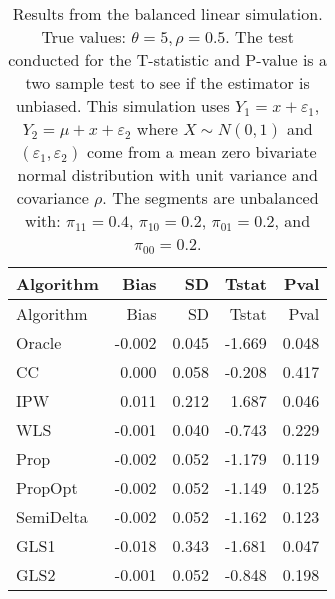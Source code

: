 \documentclass[
  letterpaper,
  DIV=11,
  numbers=noendperiod]{scrartcl}
\begin{document}
\begin{longtable}[]{@{}lrrrr@{}}
\caption{Results from the balanced linear simulation. True values:
\(\theta = 5, \rho = 0.5\). The test conducted for the T-statistic and
P-value is a two sample test to see if the estimator is unbiased. This
simulation uses \(Y_1 = x + \varepsilon_1\),
\(Y_2 = \mu + x + \varepsilon_2\) where \(X \sim N(0, 1)\) and
\((\varepsilon_1, \varepsilon_2)\) come from a mean zero bivariate
normal distribution with unit variance and covariance \(\rho\). The
segments are unbalanced with: \(\pi_{11} = 0.4\), \(\pi_{10} = 0.2\),
\(\pi_{01} = 0.2\), and \(\pi_{00} = 0.2\). }\tabularnewline
\toprule\noalign{}
Algorithm & Bias & SD & Tstat & Pval \\
\midrule\noalign{}
\endfirsthead
\toprule\noalign{}
Algorithm & Bias & SD & Tstat & Pval \\
\midrule\noalign{}
\endhead
\bottomrule\noalign{}
\endlastfoot
Oracle & -0.002 & 0.045 & -1.669 & 0.048 \\
CC & 0.000 & 0.058 & -0.208 & 0.417 \\
IPW & 0.011 & 0.212 & 1.687 & 0.046 \\
WLS & -0.001 & 0.040 & -0.743 & 0.229 \\
Prop & -0.002 & 0.052 & -1.179 & 0.119 \\
PropOpt & -0.002 & 0.052 & -1.149 & 0.125 \\
SemiDelta & -0.002 & 0.052 & -1.162 & 0.123 \\
GLS1 & -0.018 & 0.343 & -1.681 & 0.047 \\
GLS2 & -0.001 & 0.052 & -0.848 & 0.198 \\
\end{longtable}
\end{document}
